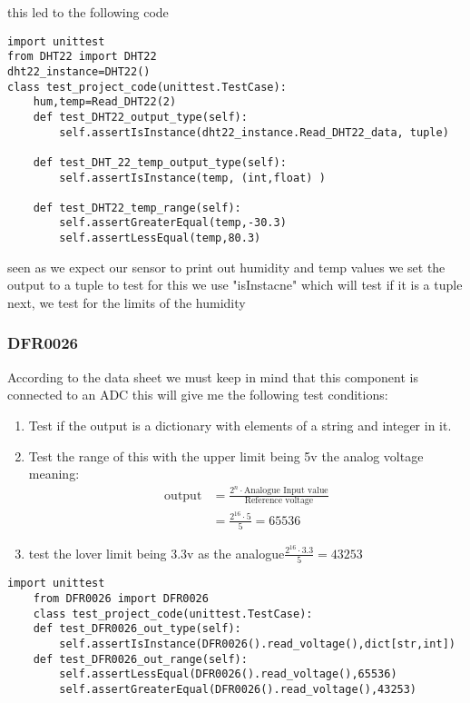 this led to the  following code 
\begin{lstlisting}[style=mystyle,caption={sample test for DHT22}]
import unittest
from DHT22 import DHT22
dht22_instance=DHT22()
class test_project_code(unittest.TestCase):
    hum,temp=Read_DHT22(2)
    def test_DHT22_output_type(self):
        self.assertIsInstance(dht22_instance.Read_DHT22_data, tuple)

    def test_DHT_22_temp_output_type(self):
        self.assertIsInstance(temp, (int,float) )

    def test_DHT22_temp_range(self):
        self.assertGreaterEqual(temp,-30.3)
        self.assertLessEqual(temp,80.3)
\end{lstlisting}
seen as we expect our sensor to  print out humidity and temp values we  set the  output to  a tuple 
to test for this we use "isInstacne" which will test if it is a tuple
next, we test for the  limits of the  humidity
\subsubsection{DFR0026}
According to the  data sheet \cite{ada} we must keep in mind  that this  component is  connected to  an ADC 
this  will  give  me  the  following  test conditions:
\begin{enumerate}
    \item Test if the output is a dictionary with elements of a string and integer in it.

    \item Test  the  range of this  with the  upper limit being 5v the analog voltage meaning:
    $$\begin{aligned}\text{output}&= \frac{2^n\cdot \text{Analogue Input value}}{\text{Reference voltage}}\\ &=\frac{2^{16}\cdot 5}{5}=65536\end{aligned}$$
    \item test the  lover limit being 3.3v as the analogue$\frac{2^{16}\cdot 3.3}{5}=43253$
\end{enumerate}
\begin{lstlisting}[style=mystyle,caption={unit test for  DFR0026 and  MCP3008}]
    import unittest
    from DFR0026 import DFR0026
    class test_project_code(unittest.TestCase):
    def test_DFR0026_out_type(self):
        self.assertIsInstance(DFR0026().read_voltage(),dict[str,int])
    def test_DFR0026_out_range(self):
        self.assertLessEqual(DFR0026().read_voltage(),65536)
        self.assertGreaterEqual(DFR0026().read_voltage(),43253)
\end{lstlisting}
